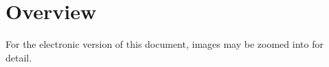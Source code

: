 \chapter{Overview}
%
For the electronic version of this document, images may be zoomed into for detail.